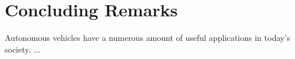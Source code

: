 \documentclass[letterpaper,12pt]{article}   %
\begin{document}


\section{Concluding Remarks}
Autonomous vehicles have a numerous amount of useful applications in today's society. ...

\pagebreak


\end{document}
